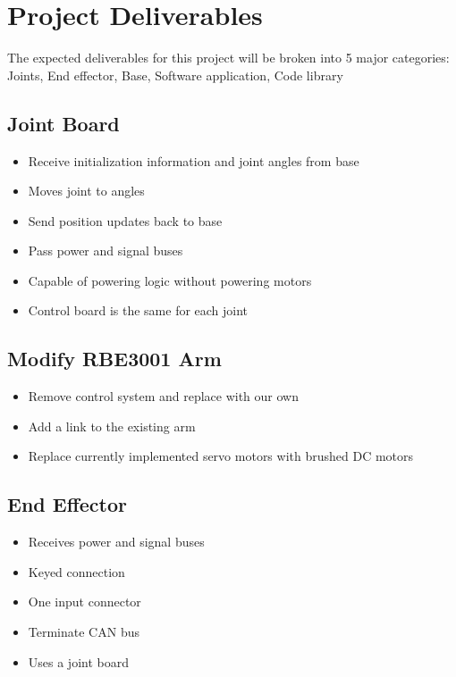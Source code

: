 \section{Project Deliverables}
The expected deliverables for this project will be broken into 5 major categories: Joints, End effector, Base, Software application, Code library

\subsection{Joint Board}
\begin{itemize}
\item Receive initialization information and joint angles from base
\item Moves joint to angles
\item Send position updates back to base
\item Pass power and signal buses
\item Capable of powering logic without powering motors
\item Control board is the same for each joint
\end{itemize}

\subsection{Modify RBE3001 Arm}
\begin{itemize}
\item Remove control system and replace with our own 
\item Add a link to the existing arm
\item Replace currently implemented servo motors with brushed DC motors
\end{itemize}

\subsection{End Effector}
\begin{itemize}
\item Receives power and signal buses
\item Keyed connection
\item One input connector
\item Terminate CAN bus
\item Uses a joint board
\end{itemize}

